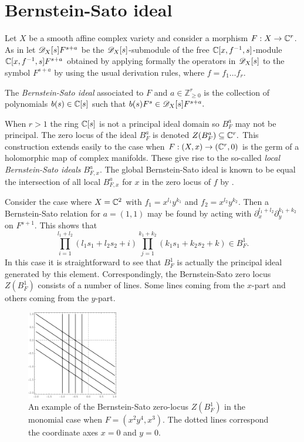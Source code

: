 \section{Bernstein-Sato ideal}\label{sec: BSIdeal}
Let $X$ be a smooth affine complex variety and consider a morphism $F:X\to \mathbb{C}^r$.
As in  let $\mathscr{D}_X[s]F^{s+a}$ be the $\mathscr{D}_X[s]$-submodule of the free $\mathbb{C}[x,f^{-1},s]$-module $\mathbb{C}[x,f^{-1},s]F^{s+a}$ obtained by applying formally the operators in $\mathscr{D}_X[s]$ to the symbol $F^{s+a}$ by using the usual derivation rules, where $f=f_1\ldots f_r$.
\begin{definition}
  The {\it Bernstein-Sato ideal} associated to $F$ and $a\in \mathbb{Z}_{\geq 0}^r$ is the collection of polynomials $b(s)\in \mathbb{C}[s]$ such that $b(s)F^s \in  \mathscr{D}_X[s]F^{s+a}.$
\end{definition}
When $r>1$ the ring $\mathbb{C}[s]$ is not a principal ideal domain so $B_F^{a}$ may not be principal.
The zero locus of the ideal $B_F^a$ is denoted $Z(B_F^a)\subseteq \mathbb{C}^r.$
This construction extends easily to the case when $F:(X,x)\to (\mathbb{C}^r,0)$ is the germ of a holomorphic map of complex manifolds.
These give rise to the so-called {\it local Bernstein-Sato ideals} $B_{F,x}^a$.
The global Bernstein-Sato ideal is known to be equal the intersection of all local $B_{F,x}^a$ for $x$ in the zero locus of $f$ by \cite{brianccon2002remarques}.
\begin{example}
  Consider the case where $X=\mathbb{C}^2$ with $f_1 = x^{l_1}y^{k_1}$ and $f_2 = x^{l_2}y^{k_2}$.
  Then a Bernstein-Sato relation for $a = (1,1)$ may be found by acting with $\partial_x^{l_1 + l_2}\partial_y^{k_1 + k_2}$ on $F^{s+1}$.
  This shows that
  $$\prod_{i=1}^{l_1 + l_2}(l_1 s_1 + l_2 s_2 + i) \prod_{j=1}^{k_1 + k_2}  (k_1s_1 + k_2 s_2 + k) \in B_F^{1}.$$
  In this case it is straightforward to see that $B_F^{1}$ is actually the principal ideal generated by this element.
  Correspondingly, the Bernstein-Sato zero locus $Z(B_F^1)$ consists of a number of lines.
  Some lines coming from the $x$-part and others coming from the $y$-part.
  \begin{figure}[h!]
    \centering
    \includegraphics[width =4cm ]{Figures/MonomialBS2}
    \caption{An example of the Bernstein-Sato zero-locus $Z(B_F^1)$ in the monomial case when $F = (x^2y^4, x^3)$. The dotted lines correspond the coordinate axes $x=0$ and $y=0$.}
  \end{figure}
  \end{example}
